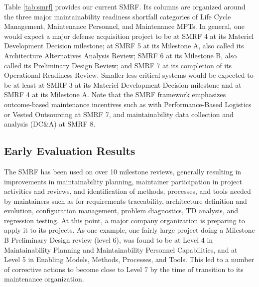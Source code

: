 Table \ref{tab:smrf} provides our current SMRF. Its columns are organized around the three major maintainability readiness shortfall categories of Life Cycle Management, Maintenance Personnel, and Maintenance MPTs. In general, one would expect a major defense acquisition project to be at SMRF 4 at its Materiel Development Decision milestone; at SMRF 5 at its Milestone A, also called its Architecture Alternatives Analysis Review; SMRF 6 at its Milestone B, also called its Preliminary Design Review; and SMRF 7 at its completion of its Operational Readiness Review. Smaller less-critical systems would be expected to be at least at SMRF 3 at its Materiel Development Decision milestone and at SMRF 4 at its Milestone A. Note that the SMRF framework emphasizes outcome-based maintenance incentives such as with Performance-Based Logistics or Vested Outsourcing \cite{vitasek2013vested} at SMRF 7, and maintainability data collection and analysis (DC\&A) at SMRF 8.



\subsection{Early Evaluation Results}
The SMRF has been used on over 10 milestone reviews, generally resulting in improvements in maintainability planning, maintainer participation in project activities and reviews, and identification  of methods, processes, and tools needed by maintainers such as  for requirements traceability, architecture definition and evolution, configuration management, problem diagnostics, TD analysis, and regression testing. At this point, a major company organization is preparing to apply it to its projects.
As one example, one fairly large project doing a Milestone B Preliminary Design review (level 6), was found to be at Level 4 in Maintainability Planning and Maintainability Personnel Capabilities, and at Level 5 in Enabling Models, Methods, Processes, and Tools. This led to a number of corrective actions to become close to Level 7 by the time of transition to its maintenance organization.

